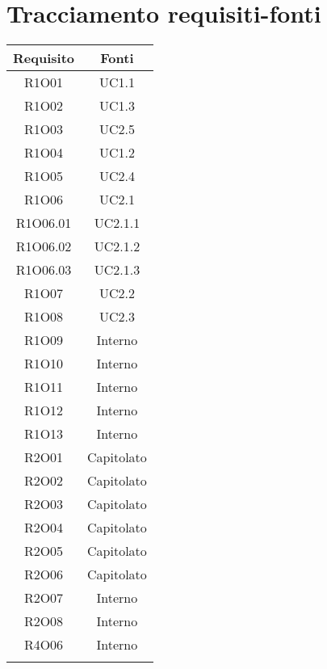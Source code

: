 \section{Tracciamento requisiti-fonti}
\begin{tabularx}{\textwidth}{|C|C|}
	\hline
	\textbf{Requisito} & \textbf{Fonti} \\
	\hline
	R1O01& UC1.1\\
	\hline
	R1O02& UC1.3\\
	\hline
	R1O03& UC2.5\\
	\hline
	R1O04& UC1.2\\
	\hline
	R1O05& UC2.4\\
	\hline
	R1O06& UC2.1\\
	\hline
	R1O06.01& UC2.1.1\\
	\hline
	R1O06.02& UC2.1.2\\
	\hline
	R1O06.03& UC2.1.3\\
	\hline
	R1O07& UC2.2\\
	\hline	
	R1O08& UC2.3\\
	\hline	
	R1O09& Interno\\
	\hline	
	R1O10& Interno\\
	\hline
	R1O11& Interno\\
	\hline	
	R1O12& Interno\\
	\hline
	R1O13& Interno\\
	\hline
	R2O01 &Capitolato\\
	\hline
	R2O02 &Capitolato\\
	\hline
	R2O03 &Capitolato\\
	\hline
	R2O04 &Capitolato\\
	\hline
	R2O05 &Capitolato\\
	\hline
	R2O06 &Capitolato\\
	\hline
	R2O07 &Interno\\
	\hline
	R2O08 &Interno\\
	\hline
	R4O06 &Interno\\
	\hline
	
	\caption{Tabella requisiti-fonti}
\end{tabularx}